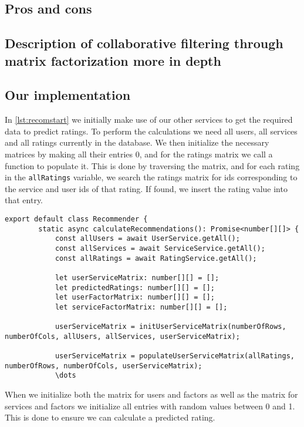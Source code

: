 \subsection{Pros and cons}


\subsection{Description of collaborative filtering through matrix factorization more in depth}

\subsection{Our implementation}
In \autoref{lst:recomstart} we initially make use of our other services to get the required data to predict ratings.
To perform the calculations we need all users, all services and all ratings currently in the database.
We then initialize the necessary matrices by making all their entries 0, and for the ratings matrix we call a function to populate it.
This is done by traversing the matrix, and for each rating in the \texttt{allRatings} variable, we search the ratings matrix for ids corresponding to the service and user ids of that rating.
If found, we insert the rating value into that entry.
\begin{lstlisting}[caption={The start of the recommender}, captionpos=b, label={lst:recomstart}]
    export default class Recommender {
        static async calculateRecommendations(): Promise<number[][]> {
            const allUsers = await UserService.getAll();
            const allServices = await ServiceService.getAll();
            const allRatings = await RatingService.getAll();
    
            let userServiceMatrix: number[][] = [];
            let predictedRatings: number[][] = [];
            let userFactorMatrix: number[][] = [];
            let serviceFactorMatrix: number[][] = [];

            userServiceMatrix = initUserServiceMatrix(numberOfRows, numberOfCols, allUsers, allServices, userServiceMatrix);

		    userServiceMatrix = populateUserServiceMatrix(allRatings, numberOfRows, numberOfCols, userServiceMatrix);
            \dots
\end{lstlisting}
When we initialize both the matrix for users and factors as well as the matrix for services and factors we initialize all entries with random values between 0 and 1.
This is done to ensure we can calculate a predicted rating.

